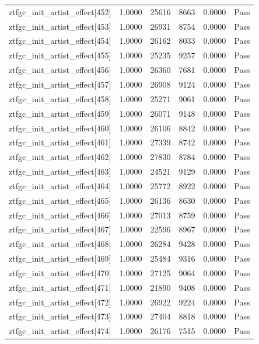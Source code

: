 \begin{table}[htbp]
\begin{tabular}{llrrll}
ztfgc\_init\_artist\_effect[452] & 1.0000 & 25616 & 8663 & 0.0000 & Pass \\
ztfgc\_init\_artist\_effect[453] & 1.0000 & 26931 & 8754 & 0.0000 & Pass \\
ztfgc\_init\_artist\_effect[454] & 1.0000 & 26162 & 8033 & 0.0000 & Pass \\
ztfgc\_init\_artist\_effect[455] & 1.0000 & 25235 & 9257 & 0.0000 & Pass \\
ztfgc\_init\_artist\_effect[456] & 1.0000 & 26360 & 7681 & 0.0000 & Pass \\
ztfgc\_init\_artist\_effect[457] & 1.0000 & 26908 & 9124 & 0.0000 & Pass \\
ztfgc\_init\_artist\_effect[458] & 1.0000 & 25271 & 9061 & 0.0000 & Pass \\
ztfgc\_init\_artist\_effect[459] & 1.0000 & 26071 & 9148 & 0.0000 & Pass \\
ztfgc\_init\_artist\_effect[460] & 1.0000 & 26106 & 8842 & 0.0000 & Pass \\
ztfgc\_init\_artist\_effect[461] & 1.0000 & 27339 & 8742 & 0.0000 & Pass \\
ztfgc\_init\_artist\_effect[462] & 1.0000 & 27830 & 8784 & 0.0000 & Pass \\
ztfgc\_init\_artist\_effect[463] & 1.0000 & 24521 & 9129 & 0.0000 & Pass \\
ztfgc\_init\_artist\_effect[464] & 1.0000 & 25772 & 8922 & 0.0000 & Pass \\
ztfgc\_init\_artist\_effect[465] & 1.0000 & 26136 & 8630 & 0.0000 & Pass \\
ztfgc\_init\_artist\_effect[466] & 1.0000 & 27013 & 8759 & 0.0000 & Pass \\
ztfgc\_init\_artist\_effect[467] & 1.0000 & 22596 & 8967 & 0.0000 & Pass \\
ztfgc\_init\_artist\_effect[468] & 1.0000 & 26284 & 9428 & 0.0000 & Pass \\
ztfgc\_init\_artist\_effect[469] & 1.0000 & 25484 & 9316 & 0.0000 & Pass \\
ztfgc\_init\_artist\_effect[470] & 1.0000 & 27125 & 9064 & 0.0000 & Pass \\
ztfgc\_init\_artist\_effect[471] & 1.0000 & 21890 & 9408 & 0.0000 & Pass \\
ztfgc\_init\_artist\_effect[472] & 1.0000 & 26922 & 9224 & 0.0000 & Pass \\
ztfgc\_init\_artist\_effect[473] & 1.0000 & 27404 & 8818 & 0.0000 & Pass \\
ztfgc\_init\_artist\_effect[474] & 1.0000 & 26176 & 7515 & 0.0000 & Pass \\

\end{tabular}
\end{table}
